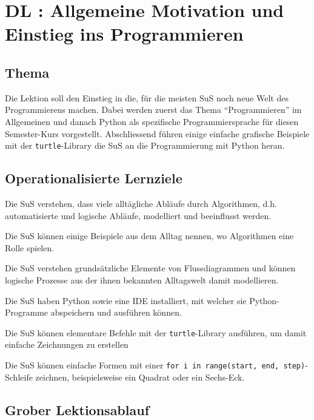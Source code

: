 \tableofcontents

\newpage
\section{DL \themycounter: Allgemeine Motivation und Einstieg ins Programmieren}
\begin{myExBox}[title=DL \themycounter]
\subsection*{Thema}
Die Lektion soll den Einstieg in die, für die meisten SuS noch neue Welt des Programmierens machen. Dabei werden zuerst das Thema ``Programmieren'' im Allgemeinen und danach Python als spezifische Programmiersprache für diesen Semester-Kurs vorgestellt. Abschliessend führen einige einfache grafische Beispiele mit der \lstinline|turtle|-Library die SuS an die Programmierung mit Python heran.


\subsection*{Operationalisierte Lernziele}
\begin{todolist}
    \item Die SuS verstehen, dass viele alltägliche Abläufe durch Algorithmen, d.h. automatisierte und logische Abläufe, modelliert und beeinflusst werden.
    \item Die SuS können einige Beispiele aus dem Alltag nennen, wo Algorithmen eine Rolle spielen.
    \item Die SuS verstehen grundsätzliche Elemente von Flussdiagrammen und können logische Prozesse aus der ihnen bekannten Alltagswelt damit modellieren.
    \item Die SuS haben Python sowie eine IDE installiert, mit welcher sie Python-Programme abspeichern und ausführen können.
    \item Die SuS können elementare Befehle mit der \lstinline|turtle|-Library ausführen, um damit einfache Zeichnungen zu erstellen
    \item Die SuS können einfache Formen mit einer \lstinline|for i in range(start, end, step)|-Schleife zeichnen, beispielsweise ein Quadrat oder ein Sechs-Eck.
\end{todolist}

\subsection*{Grober Lektionsablauf}

\end{myExBox}
